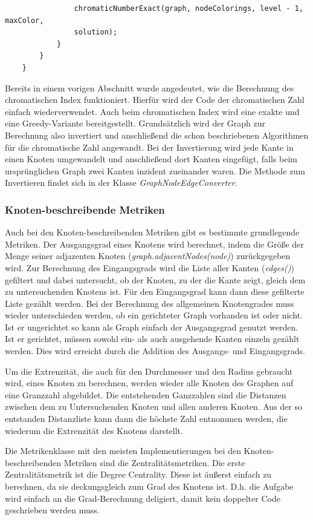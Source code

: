 \documentclass[a4paper,12pt,ngerman,chapterprefix=false,listof=totoc,bibliography=totoc]{scrreprt}
\begin{document}
{{{\begin{lstlisting}
				chromaticNumberExact(graph, nodeColorings, level - 1, maxColor,
				solution);
			}
		}
	}
\end{lstlisting}
Bereits in einem vorigen Abschnitt wurde angedeutet, wie die Berechnung des chromatischen Index funktioniert. Hierfür wird der Code der chromatischen Zahl einfach wiederverwendet. Auch beim chromatischen Index wird eine exakte und eine Greedy-Variante bereitgestellt. Grundsätzlich wird der Graph zur Berechnung also invertiert und anschließend die schon beschriebenen Algorithmen für die chromatische Zahl angewandt. Bei der Invertierung wird jede Kante in einen Knoten umgewandelt und anschließend dort Kanten eingefügt, falls beim ursprünglichen Graph zwei Kanten inzident zueinander waren. Die Methode zum Invertieren findet sich in der Klasse \textit{GraphNodeEdgeConverter}.
}
\subsubsection*{Knoten-beschreibende Metriken}
{
Auch bei den Knoten-beschreibenden Metriken gibt es bestimmte grundlegende Metriken. Der Ausgangsgrad eines Knotens wird berechnet, indem die Größe der Menge seiner adjazenten Knoten (\textit{graph.adjacentNodes(node)}) zurückgegeben wird. Zur Berechnung des Eingangsgrads wird die Liste aller Kanten (\textit{edges()}) gefiltert und dabei untersucht, ob der Knoten, zu der die Kante zeigt, gleich dem zu untersuchenden Knotens ist. Für den Eingangsgrad kann dann diese gefilterte Liste gezählt werden. Bei der Berechnung des allgemeinen Knotengrades muss wieder unterschieden werden, ob ein gerichteter Graph vorhanden ist oder nicht. Ist er ungerichtet so kann als Graph einfach der Ausgangsgrad genutzt werden. Ist er gerichtet, müssen sowohl ein- als auch ausgehende Kanten einzeln gezählt werden. Dies wird erreicht durch die Addition des Ausgangs- und Eingangsgrads.

Um die Extrenzität, die auch für den Durchmesser und den Radius gebraucht wird, eines Knoten zu berechnen, werden wieder alle Knoten des Graphen auf eine Granzzahl abgebildet. Die entstehenden Ganzzahlen sind die Distanzen zwischen dem zu Untersuchenden Knoten und allen anderen Knoten. Aus der so entstanden Distanzliste kann dann die höchste Zahl entnommen werden, die wiederum die Extrenzität des Knotens darstellt.

Die Metrikenklasse mit den meisten Implementierungen bei den Knoten-beschreibenden Metriken sind die Zentralitätsmetriken. Die erste Zentralitätsmetrik ist die Degree Centrality. Diese ist äußerst einfach zu berechnen, da sie deckungsgleich zum Grad des Knotens ist. D.h. die Aufgabe wird einfach an die Grad-Berechnung deligiert, damit kein doppelter Code geschrieben werden muss.

}}}
\end{document}
